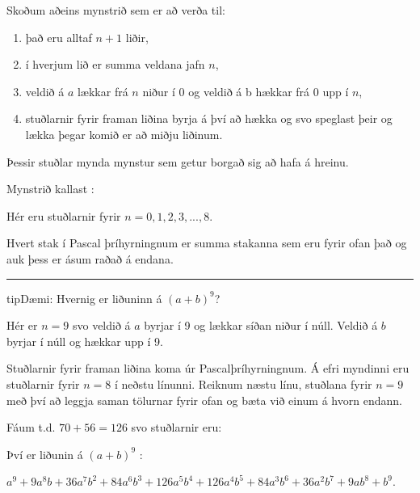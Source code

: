 \documentclass[a4paper,10pt,icelandic]{sphinxmanual}
\begin{document}
Skoðum aðeins mynstrið sem er að verða til:
\begin{enumerate}
%
\item {} 
það eru alltaf \(n+1\) liðir,

\item {} 
í hverjum lið er summa veldana jafn \(n\),

\item {} 
veldið á \(a\) lækkar frá \(n\) niður í \(0\) og veldið á b hækkar frá \(0\) upp í \(n\),

\item {} 
stuðlarnir fyrir framan liðina byrja á því að hækka og svo speglast þeir og lækka þegar komið er að miðju liðinum.

\end{enumerate}

Þessir stuðlar mynda mynstur sem getur borgað sig að hafa á hreinu.

Mynstrið kallast :


Hér eru stuðlarnir fyrir \(n=0,1,2,3,...,8\).

Hvert stak í Pascal þríhyrningnum er summa stakanna sem eru fyrir ofan það og auk þess er ásum raðað á endana.



\bigskip\hrule\bigskip


\begin{sphinxadmonition}{tip}{Dæmi:}
Hvernig er liðuninn á \((a+b)^9\)?

Hér er \(n=9\) svo veldið á \(a\) byrjar í 9 og lækkar síðan niður í núll.
Veldið á \(b\) byrjar í núll og hækkar upp í 9.

Stuðlarnir fyrir framan liðina koma úr Pascal\sphinxhyphen{}þríhyrningnum.
Á efri myndinni eru stuðlarnir fyrir \(n=8\) í neðstu línunni.
Reiknum næstu línu, stuðlana fyrir \(n=9\) með því að leggja saman tölurnar fyrir ofan og bæta við einum á hvorn endann.

Fáum t.d. \(70+56=126\) svo stuðlarnir eru:

\begin{figure}[H]
\centering

\noindent{}
\end{figure}

Því er liðunin á \((a+b)^9\) :

\(a^9 + 9a^8b + 36a^7b^2 + 84a^6b^3 + 126a^5b^4 + 126a^4b^5 + 84a^3b^6 + 36a^2b^7 +  9ab^8 + b^9\).
\end{sphinxadmonition}
\end{document}
